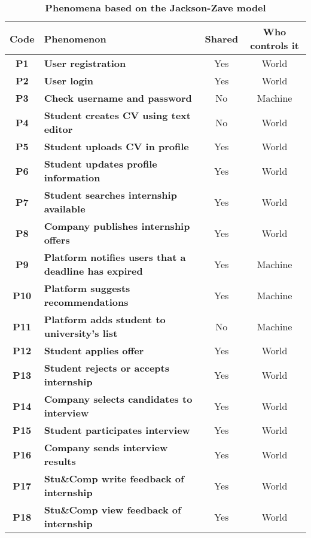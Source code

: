 \begin{table}[H]
    \caption*{\textbf{Phenomena based on the Jackson-Zave model}}
    \centering 
    \begin{tabular}{|c|p{20em}|c|c|}
    \hline
    \rowcolor{bluepoli!40} %
    \textbf{Code} & \textbf{Phenomenon} & \textbf{Shared} & \textbf{Who controls it} \T\B \\
    \hline
    \textbf{P1} & \textbf{User registration} & Yes & World \T\B \\
    \textbf{P2} & \textbf{User login} & Yes & World \T\B\\
    \textbf{P3} & \textbf{Check username and password} & No & Machine \T\B\\
    \textbf{P4} & \textbf{Student creates CV using text editor} & No & World  \T\B \\
    \textbf{P5} & \textbf{Student uploads CV in profile} & Yes & World  \T\B \\
    \textbf{P6} & \textbf{Student updates profile information} & Yes & World  \T\B \\
    \textbf{P7} & \textbf{Student searches internship available} & Yes & World \T\B\\
    \textbf{P8} & \textbf{Company publishes internship offers} & Yes & World \T\B \\
    \textbf{P9} & \textbf{Platform notifies users that a deadline has expired} & Yes & Machine \B\\
    \textbf{P10} & \textbf{Platform suggests recommendations} & Yes & Machine \T\B \\
    \textbf{P11} & \textbf{Platform adds student to university's list} & No & Machine \T\B \\
    \textbf{P12} & \textbf{Student applies offer} & Yes & World \B\\
    \textbf{P13} & \textbf{Student rejects or accepts internship} & Yes & World \T\B \\
    \textbf{P14} & \textbf{Company selects candidates to interview} & Yes & World \T\B\\
    \textbf{P15} & \textbf{Student participates interview} & Yes & World \T\B \\
    \textbf{P16} & \textbf{Company sends interview results} & Yes & World \B\\
    \textbf{P17} & \textbf{Stu\&Comp write feedback of internship} & Yes & World \T\B\\
    \textbf{P18} & \textbf{Stu\&Comp view feedback of internship} & Yes & World \B\\

\end{tabular}
\end{table}
